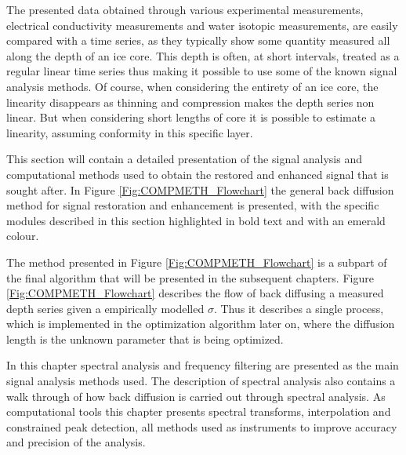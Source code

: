 \documentclass[../../CompleteThesis2/Complete_2ndDraft]{subfiles}
\begin{document}
The presented data obtained through various experimental measurements, electrical conductivity measurements and water isotopic measurements, are easily compared with a time series, as they typically show some quantity measured all along the depth of an ice core. This depth is often, at short intervals, treated as a regular linear time series thus making it possible to use some of the known signal analysis methods. Of course, when considering the entirety of an ice core, the linearity disappears as thinning and compression makes the depth series non linear. But when considering short lengths of core it is possible to estimate a linearity, assuming conformity in this specific layer. 

This section will contain a detailed presentation of the signal analysis and computational methods used to obtain the restored and enhanced signal that is sought after. In Figure \ref{Fig:COMPMETH_Flowchart} the general back diffusion method for signal restoration and enhancement is presented, with the specific modules described in this section highlighted in bold text and with an emerald colour.

The method presented in Figure \ref{Fig:COMPMETH_Flowchart} is a subpart of the final algorithm that will be presented in the subsequent chapters. Figure \ref{Fig:COMPMETH_Flowchart} describes the flow of back diffusing a measured depth series given a empirically modelled $\sigma$. Thus it describes a single process, which is implemented in the optimization algorithm later on, where the diffusion length is the unknown parameter that is being optimized.

In this chapter spectral analysis and frequency filtering are presented as the main signal analysis methods used. The description of spectral analysis also contains a walk through of how back diffusion is carried out through spectral analysis. As computational tools this chapter presents spectral transforms, interpolation and constrained peak detection, all methods used as instruments to improve accuracy and precision of the analysis.
\end{document}
